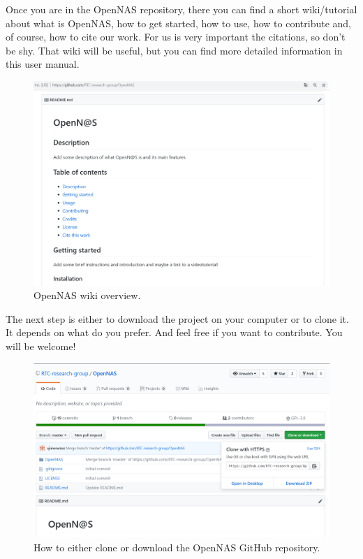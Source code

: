 Once you are in the OpenNAS repository, there you can find a short wiki/tutorial about what is OpenNAS, how to get started, how to use, how to contribute and, of course, how to cite our work. For us is very important the citations, so don't be shy. That wiki will be useful, but you can find more detailed information in this user manual.

\begin{figure}[H]
\centering
\includegraphics[width=1\textwidth]{images/Img02_OpenNASWiki_GitHub.PNG}
\caption{\label{fig:OpenNAS_wiki}OpenNAS wiki overview.}
\end{figure}

The next step is either to download the project on your computer or to clone it. It depends on what do you prefer. And feel free if you want to contribute. You will be welcome!

\begin{figure}[H]
\centering
\includegraphics[width=1\textwidth]{images/Img03_Clone_DownloadOpenNAS.PNG}
\caption{\label{fig:Download_clone_OpenNAS_repo}How to either clone or download the OpenNAS GitHub repository.}
\end{figure}

